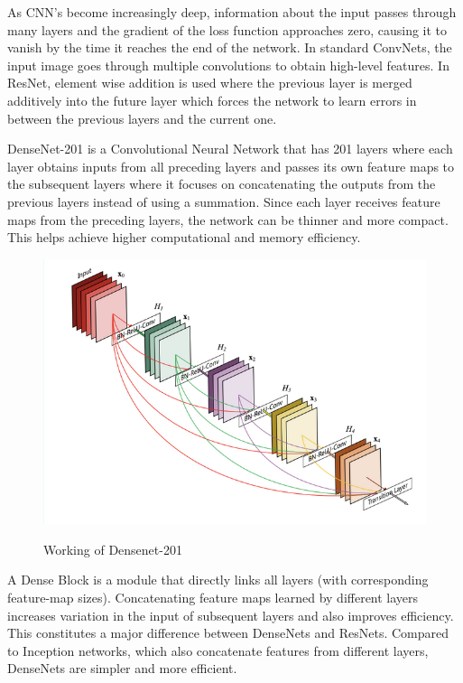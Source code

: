 \documentclass[ 12pt,a4paper,twocolumn,fleqn]{article}
\begin{document}
\begin{adjustwidth}{3.5em}{0pt}
As CNN’s become increasingly deep, information about the input passes through many layers and the gradient of the loss function approaches zero, causing it to vanish by the time it reaches the end of the network. In standard ConvNets, the input image goes through multiple convolutions to obtain high-level features. In ResNet, element wise addition is used where the previous layer is merged additively into the future layer which forces the network to learn errors in between the previous layers and the current one.

\hspace{0.2cm}
DenseNet-201 is a Convolutional Neural Network that has 201 layers where each layer obtains inputs from all preceding layers and passes its own feature maps to the subsequent layers where it focuses on concatenating the outputs from the previous layers instead of using a summation. Since each layer receives feature maps from the preceding layers, the network can be thinner and more compact. This helps achieve higher computational and memory efficiency.

\begin{figure}[H]
\begin{center}
    \hspace*{0.4in}
    \includegraphics[scale=0.4]{media/dense.png}
    \\
    \centering
  \caption{    Working of Densenet-201}
\end{center}
\end{figure}

A Dense Block is a module that directly links all layers (with corresponding feature-map sizes).
Concatenating feature maps learned by different layers increases variation in the input of subsequent layers and also improves efficiency. This constitutes a major difference between DenseNets and ResNets. Compared to Inception networks, which also concatenate features from different layers, DenseNets are simpler and more efficient. 
\hspace{0.2cm}


\end{adjustwidth}
\end{document}
